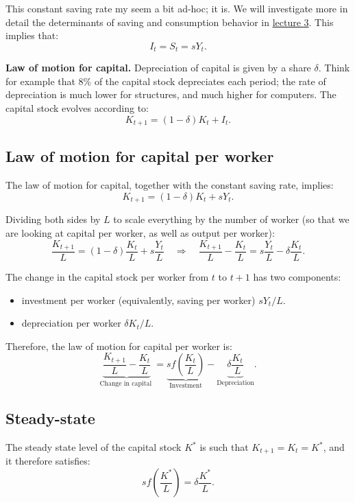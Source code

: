 \documentclass[]{book}
\providecommand{\tightlist}{%
  \setlength{\itemsep}{0pt}\setlength{\parskip}{0pt}}
\theoremstyle{definition}
\theoremstyle{definition}
\theoremstyle{definition}
\theoremstyle{remark}
\begin{document}
This constant saving rate my seem a bit ad-hoc; it is. We will
investigate more in detail the determinants of saving and consumption
behavior in \protect\hyperlink{two-period}{lecture 3}. This implies
that: \[\boxed{I_t = S_t = sY_t}.\]

\textbf{Law of motion for capital.} Depreciation of capital is given by
a share \(\delta\). Think for example that 8\% of the capital stock
depreciates each period; the rate of depreciation is much lower for
structures, and much higher for computers. The capital stock evolves
according to: \[\boxed{K_{t+1}=\left(1-\delta\right)K_{t}+I_{t}}.\]

\subsection{Law of motion for capital per
worker}\label{law-of-motion-for-capital-per-worker}

The law of motion for capital, together with the constant saving rate,
implies: \[K_{t+1}=\left(1-\delta\right)K_{t}+sY_t.\]

Dividing both sides by \(L\) to scale everything by the number of worker
(so that we are looking at capital per worker, as well as output per
worker):
\[\frac{K_{t+1}}{L} =\left(1-\delta\right)\frac{K_{t}}{L}+s\frac{Y_{t}}{L}\quad\Rightarrow\quad\boxed{\frac{K_{t+1}}{L}-\frac{K_{t}}{L}=s\frac{Y_{t}}{L}-\delta\frac{K_{t}}{L}}.\]

The change in the capital stock per worker from \(t\) to \(t+1\) has two
components:

\begin{itemize}
\tightlist
\item
  investment per worker (equivalently, saving per worker) \(s Y_t / L\).
\item
  depreciation per worker \(\delta K_t / L\).
\end{itemize}

Therefore, the law of motion for capital per worker is:
\[\underbrace{\frac{K_{t+1}}{L}-\frac{K_{t}}{L}}_{\text{Change in capital }}=\underbrace{sf\left(\frac{K_{t}}{L}\right)}_{\text{Investment}}-\underbrace{\delta\frac{K_{t}}{L}}_{\text{Depreciation}}.\]

\subsection{Steady-state}\label{steady-state}

The steady state level of the capital stock \(K^{*}\) is such that
\(K_{t+1}=K_{t}=K^{*}\), and it therefore satisfies:
\[\boxed{sf\left(\frac{K^{*}}{L}\right)=\delta\frac{K^{*}}{L}}.\]
\end{document}
